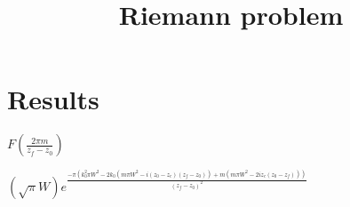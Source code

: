 \documentclass[12pt]{book}
\title{Riemann problem}
\date{}
\begin{document}
\section*{Results}


$F(\frac{2 \pi m}{z_f -z_0} )$




$(\sqrt{\pi} W) e^{\frac{ -\pi (k_0^2 \pi W^2 - 2 k_0 (m \pi  W^2 - i (z_0 - z_c) (z_f - z_0)) + m (m \pi  W^2 - 2 i z_c (z_0 - z_f)))}{(z_f - z_0)^2}}$
\end{document}
